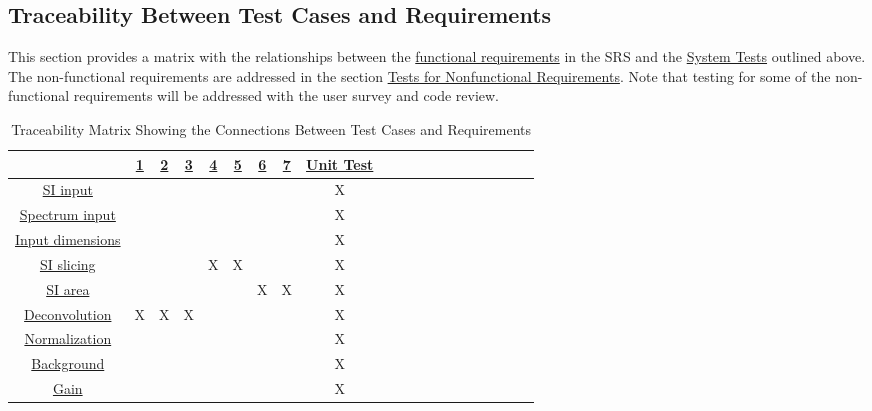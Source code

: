 \documentclass[12pt, titlepage]{article}
\begin{document}

\subsection{Traceability Between Test Cases and Requirements}
This section provides a matrix with the relationships between the
\hyperref[subsec:FR]{functional requirements} in the SRS and the
\hyperref[subsec:FuncReqTest]{System Tests} outlined above. The non-functional
requirements are addressed in the section \hyperref[subsec:NonfuncReqTest]{Tests
for Nonfunctional Requirements}. Note that testing for some of the
non-functional requirements will be addressed with the user survey and code
review.
\begin{table}[h]
	\centering
	\begin{tabular}{|c|c|c|c|c|c|c|c|c|c|c|c|c|c|c|c|c|c|c|c|}
		\hline 
		& \hyperref[TFR:RLblankPSF]{1} & \hyperref[TFR:RLerror]{2} &
\hyperref[TFR:RLSNR]{3} &  \hyperref[TFR:ImgExport]{4} &
\hyperref[TFR:ImgExportGUI]{5} & \hyperref[TFR:SpecExport]{6}&
\hyperref[TFR:SpecExportGUI]{7} & \hyperref[sec:UnitTest]{Unit Test} \\
		\hline
		\hyperref[R_SI_inputs]{SI input}     			&  &  &  &  &  &  &  & X\\ 
		\hline
		\hyperref[R_spectrum_inputs]{Spectrum input}    &  &  &  &  &  &  &  & X\\ 
		\hline
		\hyperref[R_Input_dimension]{Input dimensions}  &  &  &  &  &  &  &  & X\\
		\hline
		\hyperref[R_SI_slicing]{SI slicing}				&  &  &  & X& X&  &  & X\\ 
		\hline
		\hyperref[R_SI_area]{SI area}          			&  &  &  &  &  & X& X& X\\ 
		\hline
		\hyperref[R_deconvolution]{Deconvolution}       & X& X& X&  &  &  &  & X\\ 
		\hline
		\hyperref[R_normalization]{Normalization} 		&  &  &  &  &  &  &  & X\\ 
		\hline
		\hyperref[R_background]{Background} 			&  &  &  &  &  &  &  & X\\ 
		\hline
		\hyperref[R_gain]{Gain}  						&  &  &  &  &  &  &  & X\\ 
		\hline
	\end{tabular}
	\caption{Traceability Matrix Showing the Connections Between Test Cases and
Requirements}
	\label{Table:A_trace}
\end{table}
\end{document}
